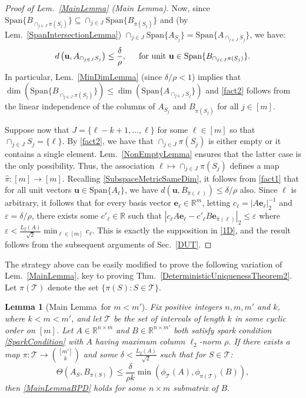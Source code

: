 \documentclass[journal, twocolumn]{IEEEtran}
\newtheorem{lemma}{Lemma}
\begin{document}
\begin{proof}[Proof of Lem.~\ref{MainLemma} (Main Lemma)]
Now, since \mbox{$\text{Span}\{B_{\cap_{j \in J}\pi(S_j)}\} \subseteq \cap_{j \in J} \text{Span}\{B_{\pi(S_j)}\}$} and (by Lem.~\ref{SpanIntersectionLemma}) $\cap_{j \in J}  \text{Span}\{A_{S_j}\} = \text{Span}\{A_{\cap_{j \in J}  S_j}\}$, we have:
\begin{align}\label{fact1}
d\left( \mathbf{u}, A_{\cap_{j \in J} S_j} \right) \leq \frac{\delta}{\rho}, \indent \text{for unit } \mathbf{u} \in \text{Span}\{B_{\cap_{j \in J}\pi(S_j)}\}.
\end{align}
In particular, Lem.~\ref{MinDimLemma} (since $\delta/\rho < 1$) implies that $\dim(\text{Span}\{B_{\cap_{j \in J}\pi(S_j)}\}) \leq \dim(\text{Span}\{A_{\cap_{j \in J} S_j}\})$ and \eqref{fact2} follows from the linear independence of the columns of $A_{S_j}$ and $B_{\pi(S_j)}$ for all $j \in [m]$.

Suppose now that $J = \{\ell-k+1, \ldots, \ell\}$ for some $\ell \in [m]$ so that \mbox{$\cap_{j \in J} S_j = \{\ell\}$}. By \eqref{fact2}, we have that $\cap_{j \in J} \pi(S_j)$ is either empty or it contains a single element. Lem.~\ref{NonEmptyLemma} ensures that the latter case is the only possibility. Thus, the association $\ell \mapsto \cap_{j \in J} \pi(S_j)$ defines a map $\hat \pi: [m] \to [m]$. Recalling \eqref{SubspaceMetricSameDim}, it follows from \eqref{fact1} that for all unit vectors $\mathbf{u} \in \text{Span}\{A_\ell\}$, we have $d\left( \mathbf{u}, B_{\hat \pi(\ell)}\right) \leq \delta/\rho$ also. Since $\ell$ is arbitrary, it follows that for every basis vector $\mathbf{e}_\ell \in \mathbb{R}^m$, letting $c_\ell = |A\mathbf{e}_\ell |_2^{-1}$ and $\varepsilon = \delta/\rho$, there exists some $c'_\ell \in \mathbb{R}$ such that $|c_\ell A\mathbf{e}_\ell - c'_\ell B\mathbf{e}_{\hat \pi(\ell)}|_2 \leq \varepsilon$ where $\varepsilon < \frac{L_2(A)}{\sqrt{2}} \min_{\ell \in [m]} c_{\ell}$. This is exactly the supposition in \eqref{1D}, and the result follows from the subsequent arguments of Sec.~\ref{DUT}.
\end{proof}

The strategy above can be easily modified to prove the following variation of Lem.~\ref{MainLemma}, key to proving Thm.~\ref{DeterministicUniquenessTheorem2}. Let $\pi(\mathcal{T})$ denote the set $\{ \pi(S): S \in \mathcal{T}\}$. 
\begin{lemma}[Main Lemma~for $m < m'$]\label{MainLemma2}
Fix positive integers $n, m, m'$ and $k$, where $k < m < m'$, and let $\mathcal{T}$ be the set of intervals of length $k$ in some cyclic order on $[m]$. Let $A \in \mathbb{R}^{n \times m}$ and $B \in \mathbb{R}^{n \times m'}$ both satisfy spark condition \eqref{SparkCondition} with $A$ having maximum column $\ell_2$-norm $\rho$. If there exists a map $\pi: \mathcal{T} \to {[m'] \choose k}$ and some $\delta < \frac{L_{2}(A)}{\sqrt{2}}$ such that for $S \in \mathcal{T}$:
\begin{equation}\label{GapUpperBound2}
\Theta(A_{S}, B_{\pi(S)}) \leq \frac{ \delta }{\rho k} \min(\phi_\mathcal{T}(A), \phi_{\pi(\mathcal{T})}(B)),
\end{equation}
then \eqref{MainLemmaBPD} holds for some $n \times m$ submatrix of $B$. 
\end{lemma}
\end{document}
